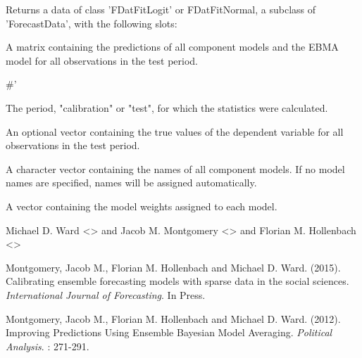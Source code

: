 \documentclass[a4paper]{book}
\begin{document}
%
\begin{Value}
Returns a data of class 'FDatFitLogit' or FDatFitNormal, a subclass of 'ForecastData', with the following slots:
\begin{ldescription}
\item[\code{predTest}] A matrix containing the predictions of all component models and the EBMA model for all observations in the test period.\end{ldescription}
\#' \begin{ldescription}
\item[\code{period}] The period, "calibration" or "test", for which the statistics were calculated.
\item[\code{outcomeTest}] An optional vector containing the true values of the dependent variable for all observations in the test period.
\item[\code{modelNames}] A character vector containing the names of all component models.  If no model names are specified, names will be assigned automatically.
\item[\code{modelWeights}] A vector containing the model weights assigned to each model.
\end{ldescription}
\end{Value}
%
\begin{Author}\relax
Michael D. Ward <> and Jacob M. Montgomery <> and Florian M. Hollenbach <>
\end{Author}
%
\begin{References}\relax
Montgomery, Jacob M., Florian M. Hollenbach and Michael D. Ward. (2015). Calibrating ensemble forecasting models with sparse data in the social sciences.   \emph{International Journal of Forecasting}. In Press.

Montgomery, Jacob M., Florian M. Hollenbach and Michael D. Ward. (2012). Improving Predictions Using Ensemble Bayesian Model Averaging. \emph{Political Analysis}. : 271-291.
\end{References}
\end{document}
